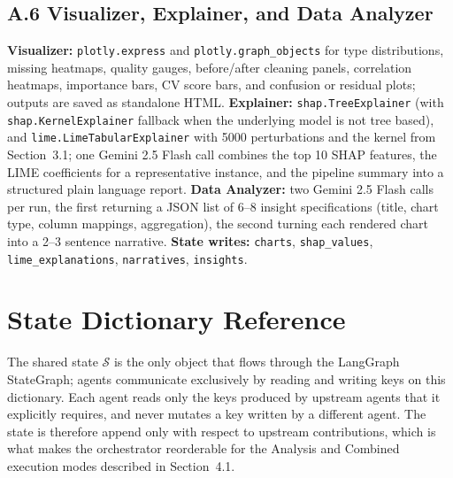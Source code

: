 \documentclass{article}
\begin{document}
\subsection*{A.6 Visualizer, Explainer, and Data Analyzer}
\textbf{Visualizer:} \texttt{plotly.express} and \texttt{plotly.graph\_objects}
for type distributions, missing heatmaps, quality gauges, before/after
cleaning panels, correlation heatmaps, importance bars, CV score bars, and
confusion or residual plots; outputs are saved as standalone HTML.
\textbf{Explainer:} \texttt{shap.TreeExplainer} (with
\texttt{shap.KernelExplainer} fallback when the underlying model is not
tree based), and \texttt{lime.LimeTabularExplainer} with 5000 perturbations
and the kernel from Section~3.1; one Gemini 2.5 Flash call combines the
top 10 SHAP features, the LIME coefficients for a representative instance,
and the pipeline summary into a structured plain language report.
\textbf{Data Analyzer:} two Gemini 2.5 Flash calls per run, the first
returning a JSON list of 6--8 insight specifications (title, chart type,
column mappings, aggregation), the second turning each rendered chart into
a 2--3 sentence narrative.
\textbf{State writes:} \texttt{charts}, \texttt{shap\_values},
\texttt{lime\_explanations}, \texttt{narratives}, \texttt{insights}.

\section{State Dictionary Reference}
\label{app:state}

The shared state $\mathcal{S}$ is the only object that flows through the
LangGraph StateGraph; agents communicate exclusively by reading and
writing keys on this dictionary. Each agent reads only the keys produced
by upstream agents that it explicitly requires, and never mutates a key
written by a different agent. The state is therefore append only with
respect to upstream contributions, which is what makes the orchestrator
reorderable for the Analysis and Combined execution modes described in
Section~4.1.



\end{document}
